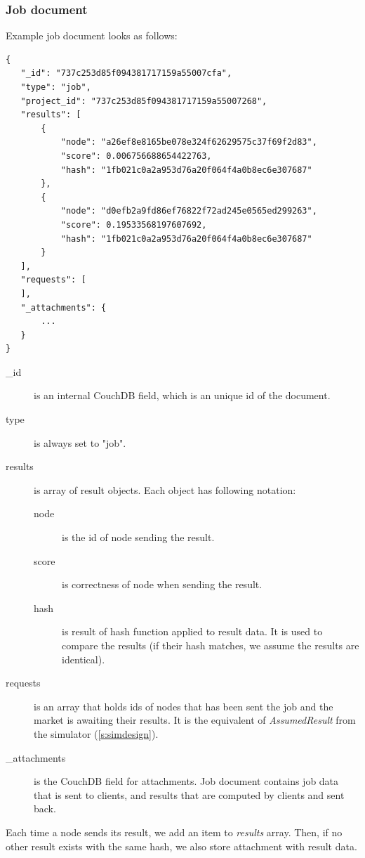 \subsubsection{Job document}

Example job document looks as follows:

\begin{lstlisting}[caption=Job document in JSON format.]
{
   "_id": "737c253d85f094381717159a55007cfa",
   "type": "job",
   "project_id": "737c253d85f094381717159a55007268",
   "results": [
       {
           "node": "a26ef8e8165be078e324f62629575c37f69f2d83",
           "score": 0.006756688654422763,
           "hash": "1fb021c0a2a953d76a20f064f4a0b8ec6e307687"
       },
       {
           "node": "d0efb2a9fd86ef76822f72ad245e0565ed299263",
           "score": 0.19533568197607692,
           "hash": "1fb021c0a2a953d76a20f064f4a0b8ec6e307687"
       }
   ],
   "requests": [
   ],
   "_attachments": {
       ...
   }
}
\end{lstlisting}

\begin{description}
\item[\_id] is an internal CouchDB field, which is an unique id of the document.
\item[type] is always set to "job".
\item[results] is array of result objects. Each object has following notation:
  \begin{description}
  \item[node] is the id of node sending the result.
  \item[score] is correctness of node when sending the result.
  \item[hash] is result of hash function applied to result data. It is used to compare the results (if their hash matches, we assume the results are identical).
  \end{description}
 \item[requests] is an array that holds ids of nodes that has been sent the job and the market is awaiting their results. It is the equivalent of \emph{AssumedResult} from the simulator (\ref{s:simdesign}).
 \item[\_attachments] is the CouchDB field for attachments. Job document contains job data that is sent to clients, and results that are computed by clients and sent back.
\end{description}

Each time a node sends its result, we add an item to \emph{results} array. Then, if no other result exists with the same hash, we also store attachment with result data.

